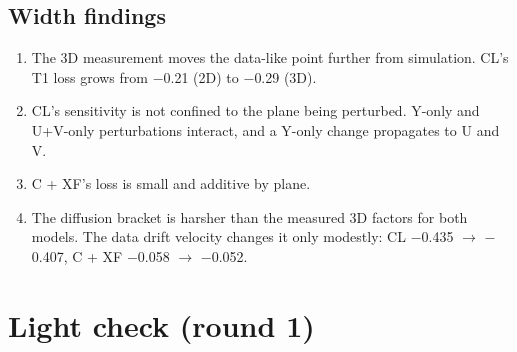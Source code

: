 \documentclass[10pt,a4paper]{article}
\begin{document}
\subsection{Width findings}
\begin{enumerate}
\item The 3D measurement moves the data-like point further from simulation. CL's T1 loss grows from $-$0.21 (2D) to $-$0.29 (3D).
\item CL's sensitivity is not confined to the plane being perturbed. Y-only and U+V-only perturbations interact, and a Y-only change propagates to U and V.
\item C + XF's loss is small and additive by plane.
\item The diffusion bracket is harsher than the measured 3D factors for both models. The data drift velocity changes it only modestly: CL $-$0.435 $\rightarrow$ $-$0.407, C + XF $-$0.058 $\rightarrow$ $-$0.052.
\end{enumerate}
\section{Light check (round 1)}
\end{document}
